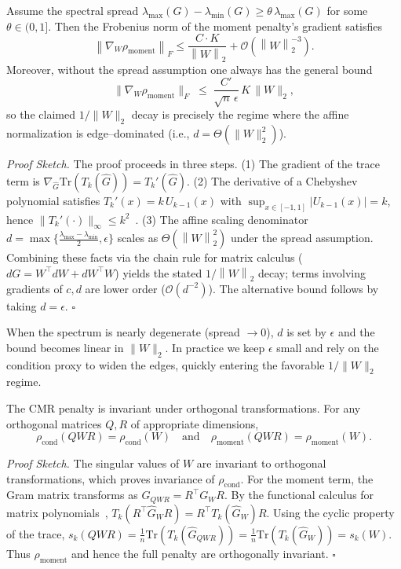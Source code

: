 \documentclass{opt2025}
\newcommand{\Tr}{\mathrm{Tr}}
\newcommand{\norm}[1]{\left\lVert #1 \right\rVert}
\newcommand{\Ghat}{\widehat{G}}
\newcommand{\condproxy}{\rho_{\text{cond}}}
\newcommand{\momentproxy}{\rho_{\text{moment}}}
\newcommand{\cmr}{\textsc{CMR}\xspace}
\begin{document}
\begin{lemma} \label{lem:moment_grad}
Assume the spectral spread $\lambda_{\max}(G) - \lambda_{\min}(G) \ge \theta\,\lambda_{\max}(G)$ for some $\theta\in(0,1]$. Then the Frobenius norm of the moment penalty's gradient satisfies
\[
\norm{\nabla_W \momentproxy}_F \le \frac{C \cdot K}{\norm{W}_2} + \mathcal{O}(\norm{W}_2^{-3}).
\]
Moreover, without the spread assumption one always has the general bound
\[
\|\nabla_W \rho_{\text{moment}}\|_F \;\le\; \frac{C'}{\sqrt{n}\,\epsilon}\,K\,\|W\|_2,
\]
so the claimed $1/\|W\|_2$ decay is precisely the regime where the affine normalization is edge–dominated (i.e., $d=\Theta(\|W\|_2^2)$).
\end{lemma}
\textit{Proof Sketch.} The proof proceeds in three steps. (1) The gradient of the trace term is $\nabla_{\Ghat}\Tr(T_k(\Ghat)) = T_k'(\Ghat)$. (2) The derivative of a Chebyshev polynomial satisfies $T_k'(x)=k\,U_{k-1}(x)$ with $\sup_{x\in[-1,1]}|U_{k-1}(x)|=k$, hence $\|T_k'(\cdot)\|_\infty\le k^2$~\citep[Thm.~1.2]{Rivlin1990}. (3) The affine scaling denominator $d = \max\{\frac{\lambda_{\max}-\lambda_{\min}}{2},\epsilon\}$ scales as $\Theta(\norm{W}_2^2)$ under the spread assumption. Combining these facts via the chain rule for matrix calculus ($dG = W^\top dW + dW^\top W$) yields the stated $1/\norm{W}_2$ decay; terms involving gradients of $c,d$ are lower order ($\mathcal{O}(d^{-2})$). The alternative bound follows by taking $d=\epsilon$. \hfill$\square$

\begin{remark}\label{rem:spread}
When the spectrum is nearly degenerate (spread $\to 0$), $d$ is set by $\epsilon$ and the bound becomes linear in $\|W\|_2$. In practice we keep $\epsilon$ small and rely on the condition proxy to widen the edges, quickly entering the favorable $1/\|W\|_2$ regime.
\end{remark}

\begin{proposition} \label{prop:invariance_main}
The \cmr penalty is invariant under orthogonal transformations. For any orthogonal matrices $Q, R$ of appropriate dimensions,
$$\condproxy(QWR) = \condproxy(W) \quad \text{and} \quad \momentproxy(QWR) = \momentproxy(W).$$
\end{proposition}
\textit{Proof Sketch.} The singular values of $W$ are invariant to orthogonal transformations, which proves invariance of $\condproxy$. For the moment term, the Gram matrix transforms as $G_{QWR} = R^\top G_W R$. By the functional calculus for matrix polynomials~\citep[Chap.~1]{Higham2008}, $T_k(R^\top \Ghat_W R)=R^\top T_k(\Ghat_W)R$. Using the cyclic property of the trace, $s_k(QWR)=\tfrac1n\Tr(T_k(\Ghat_{QWR}))=\tfrac1n\Tr(T_k(\Ghat_W))=s_k(W)$. Thus $\rho_{\text{moment}}$ and hence the full penalty are orthogonally invariant. \hfill$\square$
\end{document}
